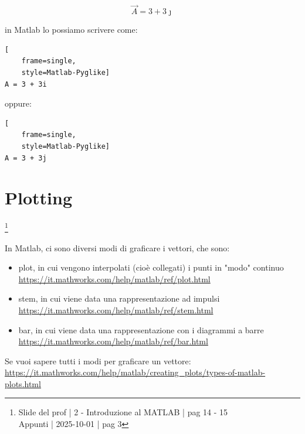{
    \Large 
    \begin{equation}
        \overrightarrow{A} = 3 + 3 \jmath
    \end{equation}
}

in Matlab lo possiamo scrivere come: 

\begin{lstlisting}[
    frame=single,
    style=Matlab-Pyglike]
A = 3 + 3i
\end{lstlisting}

oppure: 

\begin{lstlisting}[
    frame=single,
    style=Matlab-Pyglike]
A = 3 + 3j
\end{lstlisting}

\newpage 

\section{Plotting}

\footnote{ 
    Slide del prof | 2 - Introduzione al MATLAB | pag 14 - 15\\
    Appunti | 2025-10-01 | pag 3
}

In Matlab, ci sono diversi modi di graficare i vettori, che sono: 

\begin{itemize}
    \item plot, in cui vengono interpolati (cioè collegati) i punti in "modo" continuo \\\url{https://it.mathworks.com/help/matlab/ref/plot.html} 
    \item stem, in cui viene data una rappresentazione ad impulsi \\\url{https://it.mathworks.com/help/matlab/ref/stem.html}
    \item bar, in cui viene data una rappresentazione con i diagrammi a barre \\\url{https://it.mathworks.com/help/matlab/ref/bar.html} 
\end{itemize}

\begin{tcolorbox}
    Se vuoi sapere tutti i modi per graficare un vettore: \\\url{https://it.mathworks.com/help/matlab/creating_plots/types-of-matlab-plots.html}
\end{tcolorbox}

